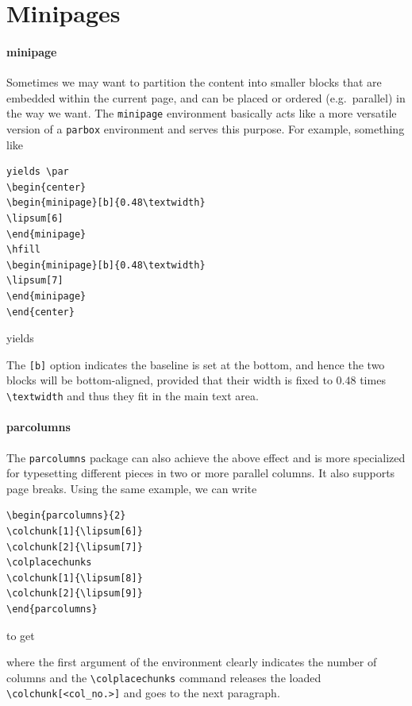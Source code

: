 \section{Minipages}

\paragraph{minipage}
Sometimes we may want to partition the content into smaller blocks that are embedded within the current page, and can be placed or ordered (e.g.\ parallel) in the way we want. The \verb|minipage| environment basically acts like a more versatile version of a \verb|parbox| environment and serves this purpose. For example, something like
\begin{lstlisting}
yields \par
\begin{center}
\begin{minipage}[b]{0.48\textwidth}
\lipsum[6]
\end{minipage}
\hfill
\begin{minipage}[b]{0.48\textwidth}
\lipsum[7]
\end{minipage}    
\end{center}      
\end{lstlisting}
yields \par
\begin{center}
\begin{minipage}[b]{0.48\textwidth}
\lipsum[6]
\end{minipage}
\hfill
\begin{minipage}[b]{0.48\textwidth}
\lipsum[7]
\end{minipage}    
\end{center}
The \verb|[b]| option indicates the baseline is set at the bottom, and hence the two blocks will be bottom-aligned, provided that their width is fixed to $0.48$ times \texttt{\textbackslash textwidth} and thus they fit in the main text area.

\paragraph{parcolumns} The \verb|parcolumns| package can also achieve the above effect and is more specialized for typesetting different pieces in two or more parallel columns. It also supports page breaks. Using the same example, we can write
\begin{lstlisting}
\begin{parcolumns}{2}
\colchunk[1]{\lipsum[6]}
\colchunk[2]{\lipsum[7]}
\colplacechunks
\colchunk[1]{\lipsum[8]}
\colchunk[2]{\lipsum[9]}
\end{parcolumns}
\end{lstlisting}
to get
\begin{parcolumns}{2}
\colchunk[1]{\lipsum[6]}
\colchunk[2]{\lipsum[7]}
\colplacechunks
\colchunk[1]{\lipsum[8]}
\colchunk[2]{\lipsum[9]}
\end{parcolumns}
where the first argument of the environment clearly indicates the number of columns and the \texttt{\textbackslash colplacechunks} command releases the loaded \texttt{\textbackslash colchunk[<col\allowbreak\_no.>]} and goes to the next paragraph.

